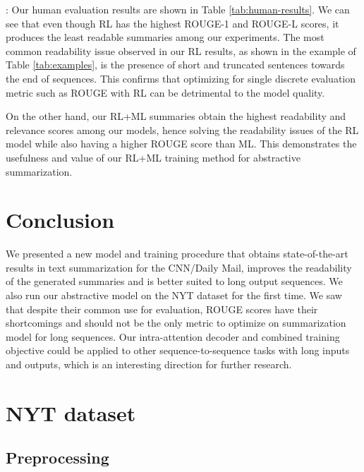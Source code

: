 \documentclass{article} \usepackage{iclr2018_arxiv,times}
\begin{document}
: Our human evaluation results are shown in Table \ref{tab:human-results}. We can see that even though RL has the highest ROUGE-1 and ROUGE-L scores, it produces the least readable summaries among our experiments. The most common readability issue observed in our RL results, as shown in the example of Table \ref{tab:examples}, is the presence of short and truncated sentences towards the end of sequences. This confirms that optimizing for single discrete evaluation metric such as ROUGE with RL can be detrimental to the model quality.

On the other hand, our RL+ML summaries obtain the highest readability and relevance scores among our models, hence solving the readability issues of the RL model while also having a higher ROUGE score than ML. This demonstrates the usefulness and value of our RL+ML training method for abstractive summarization.

\section{Conclusion}
\label{sec:conclusion}

We presented a new model and training procedure that obtains state-of-the-art results in text summarization for the CNN/Daily Mail, improves the readability of the generated summaries and is better suited to long output sequences. We also run our abstractive model on the NYT dataset for the first time. We saw that despite their common use for evaluation, ROUGE scores have their shortcomings and should not be the only metric to optimize on summarization model for long sequences. Our intra-attention decoder and combined training objective could be applied to other sequence-to-sequence tasks with long inputs and outputs, which is an interesting direction for further research.




\appendix

\section{NYT dataset}
\label{section:nyt-dataset-appx}

\subsection{Preprocessing}
\label{section:nyt-dataset-preprocessing}
\end{document}
